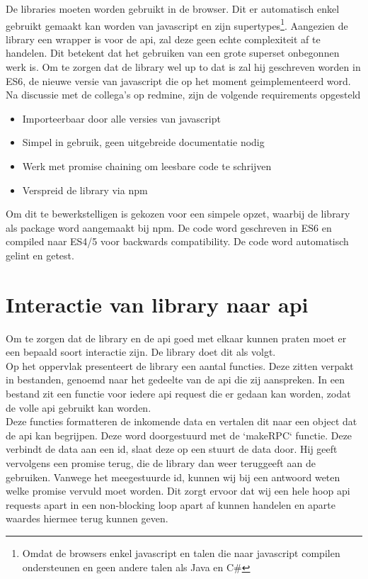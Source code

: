 De libraries moeten worden gebruikt in de browser. Dit er automatisch enkel gebruikt gemaakt kan worden van javascript en zijn supertypes\footnote{Omdat de browsers enkel javascript en talen die naar javascript compilen ondersteunen en geen andere talen als Java en C\#}. Aangezien de library een wrapper is voor de api, zal deze geen echte complexiteit af te handelen. Dit betekent dat het gebruiken van een grote superset onbegonnen werk is. Om te zorgen dat de library wel up to dat is zal hij geschreven worden  in ES6, de nieuwe versie van javascript die op het moment geimplementeerd word. \\

Na discussie met de collega's op redmine, zijn de volgende requirements opgesteld 	 

\begin{itemize}
	\item Importeerbaar door alle versies van javascript
	\item Simpel in gebruik, geen uitgebreide documentatie nodig
	\item Werk met promise chaining om leesbare code te schrijven
	\item Verspreid de library via npm
\end{itemize}

Om dit te bewerkstelligen is gekozen voor een simpele opzet, waarbij de library als package word aangemaakt bij npm. De code word geschreven in ES6 en compiled naar ES4/5 voor backwards compatibility. De code word automatisch gelint en getest.

\section{Interactie van library naar api}

Om te zorgen dat de library en de api goed met elkaar kunnen praten moet er een bepaald soort interactie zijn. De library doet dit als volgt. \\

Op het oppervlak presenteert de library een aantal functies. Deze zitten verpakt in bestanden, genoemd naar het gedeelte van de api die zij aanspreken. In een bestand zit een functie voor iedere api request die er gedaan kan worden, zodat de volle api gebruikt kan worden. \\ 

Deze functies formatteren de inkomende data en vertalen dit naar een object dat de api kan begrijpen. Deze word doorgestuurd met de `makeRPC` functie. Deze verbindt de data aan een id, slaat deze op een stuurt de data door. Hij geeft vervolgens een promise terug, die de library dan weer teruggeeft aan de gebruiken. Vanwege het meegestuurde id, kunnen wij bij een antwoord weten welke promise vervuld moet worden. Dit zorgt ervoor dat wij een hele hoop api requests apart in een non-blocking loop apart af kunnen handelen en aparte waardes hiermee terug kunnen geven. \\

